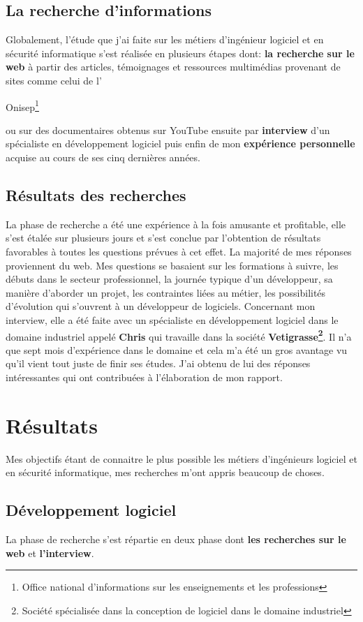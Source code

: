 \documentclass[11pt]{article}
\begin{document}
\begin{onehalfspace}
		\subsection{La recherche d'informations}
		Globalement, l'étude que j'ai faite sur les métiers d'ingénieur logiciel et en sécurité informatique s'est réalisée en plusieurs étapes dont: \textbf{la recherche sur le web} à partir des articles, témoignages et ressources multimédias provenant de sites comme celui de l'\begin{bf}Onisep\footnote{Office national d'informations sur les enseignements et les professions}\end{bf} ou sur des documentaires obtenus sur YouTube ensuite par \textbf{interview} d'un spécialiste en développement logiciel puis enfin de mon \textbf{expérience personnelle} acquise au cours de ses cinq dernières années.
		\subsection{Résultats des recherches}
		La phase de recherche a été une expérience à la fois amusante et profitable, elle s'est étalée sur plusieurs jours et s'est conclue par l'obtention de résultats favorables à toutes les questions prévues à cet effet. La majorité de mes réponses proviennent du web. Mes questions se basaient sur les formations à suivre, les débuts dans le secteur professionnel, la journée typique d'un développeur, sa manière d'aborder un projet, les contraintes liées au métier, les possibilités d'évolution qui s'ouvrent à un développeur de logiciels. Concernant mon interview, elle a été faite avec un spécialiste en développement logiciel dans le domaine industriel appelé \textbf{Chris} qui travaille dans la société \textbf{Vetigrasse\footnote{Société spécialisée dans la conception de logiciel dans le domaine industriel}}. Il n'a que sept mois d'expérience dans le domaine et cela m'a été un gros avantage vu qu'il vient tout juste de finir ses études. J'ai obtenu de lui des réponses intéressantes qui ont contribuées à l'élaboration de mon rapport.
		\newpage
		
		\section{Résultats}
		Mes objectifs étant de connaitre le plus possible les métiers d'ingénieurs logiciel et en sécurité informatique, mes recherches m'ont appris beaucoup de choses.
		\subsection{Développement logiciel}
		La phase de recherche s'est répartie en deux phase dont \textbf{les recherches sur le web} et \textbf{l'interview}.

\end{onehalfspace}
\end{document}
